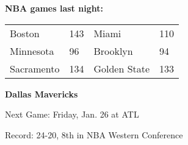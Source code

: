 \textbf{NBA games last night:
}\begin{tabular}{llll}
\toprule
    Boston & 143 &        Miami & 110 \\
 Minnesota &  96 &     Brooklyn &  94 \\
Sacramento & 134 & Golden State & 133 \\
\bottomrule
\end{tabular}

\textbf{Dallas Mavericks}

Next Game: Friday, Jan. 26 at ATL

Record: 24-20, 8th in NBA Western Conference
